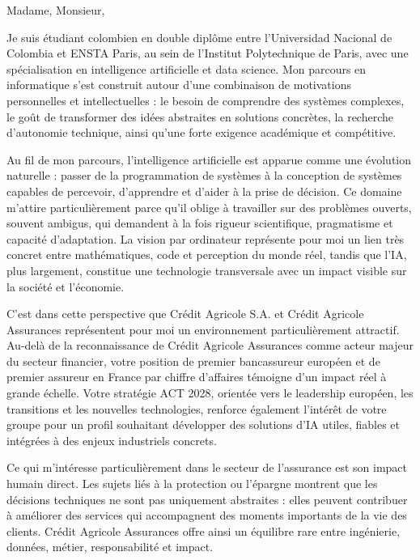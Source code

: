 \documentclass[10pt,a4paper]{article}
\begin{document}
{\small

Madame, Monsieur,

Je suis étudiant colombien en double diplôme entre l’Universidad Nacional de Colombia et ENSTA Paris, au sein de l’Institut Polytechnique de Paris, avec une spécialisation en intelligence artificielle et data science. Mon parcours en informatique s’est construit autour d’une combinaison de motivations personnelles et intellectuelles : le besoin de comprendre des systèmes complexes, le goût de transformer des idées abstraites en solutions concrètes, la recherche d’autonomie technique, ainsi qu’une forte exigence académique et compétitive.

Au fil de mon parcours, l’intelligence artificielle est apparue comme une évolution naturelle : passer de la programmation de systèmes à la conception de systèmes capables de percevoir, d’apprendre et d’aider à la prise de décision. Ce domaine m’attire particulièrement parce qu’il oblige à travailler sur des problèmes ouverts, souvent ambigus, qui demandent à la fois rigueur scientifique, pragmatisme et capacité d’adaptation. La vision par ordinateur représente pour moi un lien très concret entre mathématiques, code et perception du monde réel, tandis que l’IA, plus largement, constitue une technologie transversale avec un impact visible sur la société et l’économie.

C’est dans cette perspective que Crédit Agricole S.A. et Crédit Agricole Assurances représentent pour moi un environnement particulièrement attractif. Au-delà de la reconnaissance de Crédit Agricole Assurances comme acteur majeur du secteur financier, votre position de premier bancassureur européen et de premier assureur en France par chiffre d’affaires témoigne d’un impact réel à grande échelle. Votre stratégie ACT 2028, orientée vers le leadership européen, les transitions et les nouvelles technologies, renforce également l’intérêt de votre groupe pour un profil souhaitant développer des solutions d’IA utiles, fiables et intégrées à des enjeux industriels concrets.

Ce qui m’intéresse particulièrement dans le secteur de l’assurance est son 
impact humain direct. Les sujets liés à la protection ou l’épargne montrent que les décisions techniques ne sont pas uniquement abstraites : elles peuvent contribuer à améliorer des services qui accompagnent des moments importants de la vie des clients. Crédit Agricole Assurances offre ainsi un équilibre rare entre ingénierie, données, métier, responsabilité et impact.

}
\end{document}
